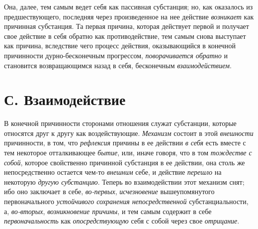 Она, далее, тем самым ведет себя как пассивная субстанция; но, как оказалось
из предшествующего, последняя через произведенное на нее действие
{\em возникает} как причинная субстанция. Та первая
причина, которая действует первой и получает свое действие в себя обратно
как противодействие, тем самым снова выступает как причина, вследствие чего
процесс действия, оказывающийся в конечной причинности дурно-бесконечным
прогрессом, {\em поворачивается обратно} и становится
возвращающимся назад в себя, бесконечным
{\em взаимодействием}.


\section[С. Взаимодействие]{С. Взаимодействие}

В конечной причинности сторонами отношения
служат субстанции, которые относятся друг к другу как воздействующие.
{\em Механизм} состоит в этой
{\em внешности} причинности, в том, что
{\em рефлексия} причины в ее действии
{\em в себя} есть вместе с тем некоторое отталкивающее
{\em бытие}, или, иначе говоря, что в том
{\em тождестве с собой}, которое свойственно причинной
субстанция в ее действии, она столь же непосредственно остается чем-то
{\em внешним} себе, и действие
{\em перешло} на некоторую
{\em другую субстанцию}. Теперь во взаимодействии этот
механизм снят; ибо оно заключает в себе,
{\em во-первых}, {\em исчезновение}
вышеупомянутого первоначального {\em устойчивого
сохранения непосредственной} субстанциальности, а,
{\em во-вторых}, {\em возникновение
причины}, и тем самым содержит в себе
{\em первоначальность} как
{\em опосредствующую} себя с собой через свое
{\em отрицание}.

